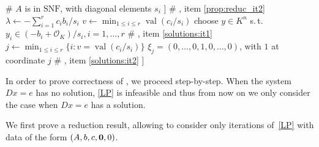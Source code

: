 \documentclass{elsarticle}
\theoremstyle{plain}
\theoremstyle{definition}
\DeclareMathOperator{\val}{val}
\newcommand{\OK}{\mathcal{O}_K}
\begin{document}
\begin{algorithm}[!ht]
\begin{algorithmic}[1]
      \hfill {\color{olive} \# $A$ is in $\mathrm{SNF}$, with diagonal elements $s_{i}$} \label{step:core:begin}
      \IF{$\bigwedge_{i=r+1}^d (\val(b_{i}) \geq 0)$} \label{step:condition}
      \RETURN [UNBOUND, []] \hfill {\color{olive} \# , item \ref{prop:reduc_it2}} \label{step:unbound}
      \ELSE %
      \STATE $\lambda \leftarrow -\sum_{i=1}^r c_i b_i / s_{i}$
      \STATE $v \leftarrow \min_{1 \leq i \leq r} \val (c_i/s_{i})$
      \IF{$\val \lambda < v$}
      \STATE choose $y \in K^n$ s.\,t. $y_i \in (-b_i+\OK)/s_{i}, i=1,\ldots,r$
      \RETURN [FEAS, $y$] \hfill {\color{olive} \# , item \ref{solutions:it1}}
      \ELSE
      \STATE $j \leftarrow \min_{1 \leq i \leq r} \{i : v = \val (c_i/s_{i})\}$
      \STATE $\xi_j = (0,\ldots,0,1,0,\ldots,0)$, with $1$ at coordinate $j$
      \RETURN [FEAS, $\xi_j$] \hfill {\color{olive} \# , item \ref{solutions:it2}}
      \ENDIF
      \ENDIF 
      \ENDIF 
      \RETURN [INFEAS, []] \label{step:core:end}
    \end{algorithmic}
\end{algorithm}

In order to prove correctness of , we proceed step-by-step.
When the system $Dx=e$ has no solution, \eqref{LP} is infeasible and
thus from now on we only consider the case when $Dx=e$ has a solution.

We first prove a reduction result, allowing to consider only iterations
of~\eqref{LP} with data of the form $(A,b,c,{\bf 0},0)$.
\end{document}
